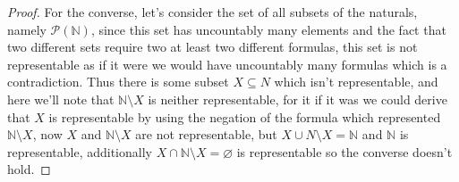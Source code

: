 \begin{proof}
    For the converse, let's consider the set of all subsets of the naturals,
    namely \( \mathcal{ P }  \left( \mathbb{N}\right)  \), since this set has
    uncountably many elements and the fact that two different sets require two
    at least two different formulas, this set is not representable as if it were
    we would have uncountably many formulas which is a contradiction. Thus there
    is some subset \( X \subseteq N \) which isn't representable, and here we'll
    note that \( \mathbb{N} \setminus X \) is neither representable, for it if
    it was we could derive that \( X \) is representable by using the negation
    of the formula which represented \( \mathbb{N} \setminus X \), now \( X \)
    and \( \mathbb{N} \setminus X \) are not representable, but \( X \cup N
    \setminus X =  \mathbb{N}  \) and \( \mathbb{N}  \) is representable,
    additionally \( X \cap \mathbb{N} \setminus X = \varnothing  \) is
    representable so the converse doesn't hold.
\end{proof}
